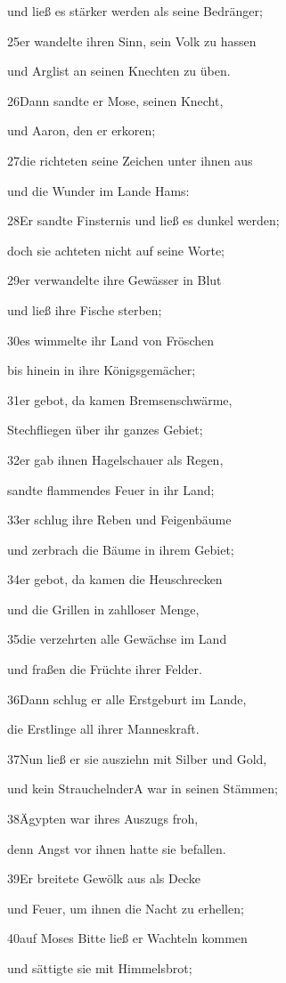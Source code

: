 und ließ es stärker werden als seine Bedränger;

25er wandelte ihren Sinn, sein Volk zu hassen

und Arglist an seinen Knechten zu üben.

26Dann sandte er Mose, seinen Knecht,

und Aaron, den er erkoren;

27die richteten seine Zeichen unter ihnen aus

und die Wunder im Lande Hams:

28Er sandte Finsternis und ließ es dunkel werden;

doch sie achteten nicht auf seine Worte;

29er verwandelte ihre Gewässer in Blut

und ließ ihre Fische sterben;

30es wimmelte ihr Land von Fröschen

bis hinein in ihre Königsgemächer;

31er gebot, da kamen Bremsenschwärme,

Stechfliegen über ihr ganzes Gebiet;

32er gab ihnen Hagelschauer als Regen,

sandte flammendes Feuer in ihr Land;

33er schlug ihre Reben und Feigenbäume

und zerbrach die Bäume in ihrem Gebiet;

34er gebot, da kamen die Heuschrecken

und die Grillen in zahlloser Menge,

35die verzehrten alle Gewächse im Land

und fraßen die Früchte ihrer Felder.

36Dann schlug er alle Erstgeburt im Lande,

die Erstlinge all ihrer Manneskraft.

37Nun ließ er sie ausziehn mit Silber und Gold,

und kein Strauchelnder{A} war in seinen Stämmen;

38Ägypten war ihres Auszugs froh,

denn Angst vor ihnen hatte sie befallen.

39Er breitete Gewölk aus als Decke

und Feuer, um ihnen die Nacht zu erhellen;

40auf Moses Bitte ließ er Wachteln kommen

und sättigte sie mit Himmelsbrot;

